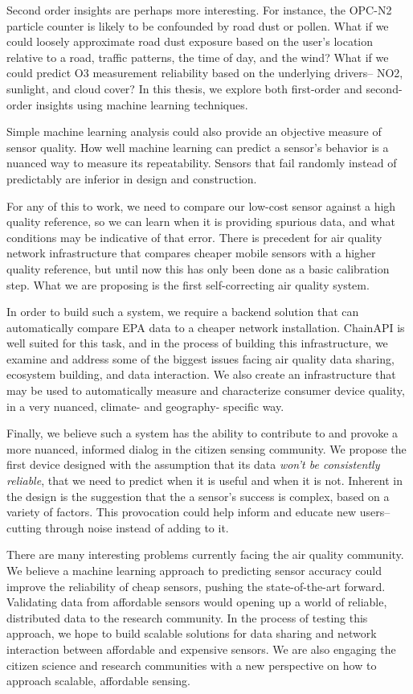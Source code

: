 Second order insights are perhaps more interesting.  For instance, the OPC-N2 particle counter is likely to be confounded by road dust or pollen.  What if we could loosely approximate road dust exposure based on the user's location relative to a road, traffic patterns, the time of day, and the wind?  What if we could predict O3 measurement reliability based on the underlying drivers-- NO2, sunlight, and cloud cover? In this thesis, we explore both first-order and second-order insights using machine learning techniques.

Simple machine learning analysis could also provide an objective measure of sensor quality.  How well machine learning can predict a sensor's behavior is a nuanced way to measure its repeatability.  Sensors that fail randomly instead of predictably are inferior in design and construction.  
     
For any of this to work, we need to compare our low-cost sensor against a high quality reference, so we can learn when it is providing spurious data, and what conditions may be indicative of that error.  There is precedent for air quality network infrastructure that compares cheaper mobile sensors with a higher quality reference, but until now this has only been done as a basic calibration step.  What we are proposing is the first self-correcting air quality system. 

In order to build such a system, we require a backend solution that can automatically compare EPA data to a cheaper network installation.  ChainAPI is well suited for this task, and in the process of building this infrastructure, we examine and address some of the biggest issues facing air quality data sharing, ecosystem building, and data interaction.  We also create an infrastructure that may be used to automatically measure and characterize consumer device quality, in a very nuanced, climate- and geography- specific way.

Finally, we believe such a system has the ability to contribute to and provoke a more nuanced, informed dialog in the citizen sensing community.  We propose the first device designed with the assumption that its data \textit{won't be consistently reliable}, that we need to predict when it is useful and when it is not.  Inherent in the design is the suggestion that the a sensor's success is complex, based on a variety of factors.  This provocation could help inform and educate new users-- cutting through noise instead of adding to it.

There are many interesting problems currently facing the air quality community.  We believe a machine learning approach to predicting sensor accuracy could improve the reliability of cheap sensors, pushing the state-of-the-art forward.   Validating data from affordable sensors would opening up a world of reliable, distributed data to the research community.  In the process of testing this approach, we hope to build scalable solutions for data sharing and network interaction between affordable and expensive sensors.  We are also engaging the citizen science and research communities with a new perspective on how to approach scalable, affordable sensing.   



